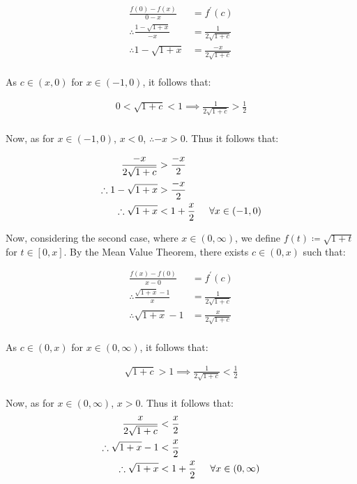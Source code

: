\documentclass[a4paper]{article}
\begin{document}
\begin{enumerate}[label=\textbf{\arabic*.}]
\begin{enumerate}
		\begin{align*}
		\frac{f(0)-f(x)}{0-x} & = f^\prime(c)\\
		\therefore \frac{1-\sqrt{1+x}}{-x} & = \frac{1}{2\sqrt{1+c}}\\
		\therefore 1-\sqrt{1+x} & = \frac{-x}{2\sqrt{1+c}}\\
		\end{align*}

		As $c\in(x,0)$ for $x \in (-1,0)$, it follows that:

		\begin{align*}
		0 < \sqrt{1+c} < 1 \implies \frac{1}{2\sqrt{1+c}} > \frac{1}{2}\\
		\end{align*}

		Now, as for $x \in (-1,0)$, $x<0$, $\therefore -x > 0$. Thus it follows that:

		\begin{align*}
		\frac{-x}{2\sqrt{1+c}} & > \frac{-x}{2}\\
		\therefore 1-\sqrt{1+x} & > \frac{-x}{2}\\
		\therefore \sqrt{1+x} & < 1 + \frac{x}{2} \hspace{5mm} \forall x \in (-1,0)\\
		\end{align*}

		\pagebreak

		Now, considering the second case, where $x \in (0,\infty)$, we define $\displaystyle{f(t) \coloneqq \sqrt{1+t}}$ for $t\in[0,x]$. By the Mean Value Theorem, there exists $c\in(0,x)$ such that:

		\begin{align*}
		\frac{f(x)-f(0)}{x-0} & = f^\prime(c)\\
		\therefore \frac{\sqrt{1+x}-1}{x} & = \frac{1}{2\sqrt{1+c}}\\
		\therefore \sqrt{1+x} - 1 & = \frac{x}{2\sqrt{1+c}}\\
		\end{align*}

		As $c\in(0,x)$ for $x \in (0,\infty)$, it follows that:

		\begin{align*}
		\sqrt{1+c} > 1 \implies \frac{1}{2\sqrt{1+c}} < \frac{1}{2}\\
		\end{align*}

		Now, as for $x \in (0,\infty)$, $x>0$. Thus it follows that:
		\begin{align*}
		\frac{x}{2\sqrt{1+c}} & < \frac{x}{2}\\
		\therefore \sqrt{1+x} -1 & < \frac{x}{2}\\
		\therefore \sqrt{1+x} & < 1 + \frac{x}{2} \hspace{5mm} \forall x \in (0,\infty)\\
		\end{align*}


\end{enumerate}
\end{enumerate}
\end{document}
